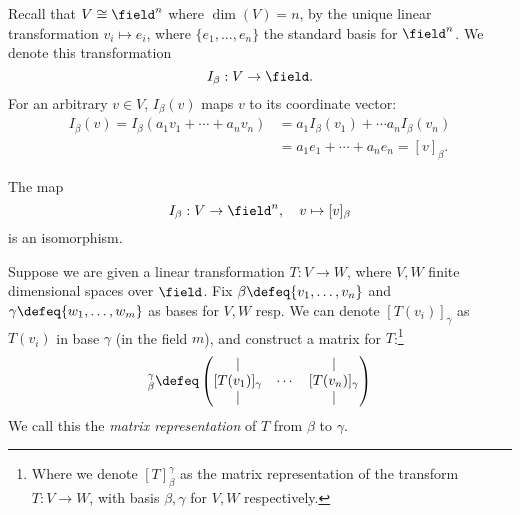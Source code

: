 \begin{remark}
    Recall that $V \cong \field^n$ where $\dim(V) = n$, by the unique linear transformation $v_i \mapsto e_i$, where $\{e_1, \dots, e_n\}$ the standard basis for $\field^n$. We denote this transformation $$I_\beta : V \to \field.$$ For an arbitrary $v \in V$, $I_\beta (v)$ maps $v$ to its coordinate vector:
    \begin{align*}
        I_\beta(v) = I_\beta(a_1v_1  + \cdots + a_n v_n) &= a_1 I_\beta(v_1) + \cdots a_n I_\beta(v_n)\\
        &= a_1 e_1 + \cdots + a_n e_n = [v]_\beta.
    \end{align*}
\end{remark}

\begin{proposition}
The map $$I_\beta : V \to \field^n, \quad v \mapsto [v]_\beta$$ is an isomorphism.
\end{proposition}

Suppose we are given a linear transformation $T : V \to W$, where $V, W$ finite dimensional spaces over $\field$. Fix $\beta \defeq \{v_1, \dots, v_n\}$ and $\gamma \defeq \{w_1, \dots, w_m\}$ as bases for $V, W$ resp. We can denote $[T(v_i)]_\gamma$ as $T(v_i)$ in base $\gamma$ (in the field $m$), and construct a matrix for $T$:\footnote{Where we denote $[T]_\beta^\gamma$ as the matrix representation of the transform $T: V \to W$, with basis $\beta, \gamma$ for $V, W$ respectively.}
\begin{align*}
    [T]_\beta^\gamma \defeq \begin{pmatrix}
        \vert & & \vert\\
        [T(v_1)]_\gamma & \cdots & [T(v_n)]_\gamma\\
        \vert& & \vert
    \end{pmatrix}
\end{align*}
We call this the \emph{matrix representation} of $T$ from $\beta$ to $\gamma$.

